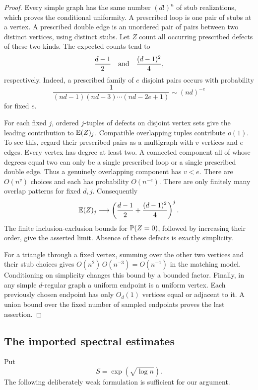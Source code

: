 \begin{proof}
Every simple graph has the same number \((d!)^n\) of stub realizations,
which proves the conditional uniformity.
A prescribed loop is one pair of stubs at a vertex. A prescribed
double edge is an unordered pair of pairs between two distinct vertices,
using distinct stubs. Let \(Z\) count all occurring prescribed defects
of these two kinds.
The expected counts tend to
\[
 \frac{d-1}{2}\quad\hbox{and}\quad\frac{(d-1)^2}{4},
\]
respectively.
Indeed, a prescribed family of \(e\) disjoint pairs occurs with
probability
\[
 \frac{1}{(nd-1)(nd-3)\cdots(nd-2e+1)}
       \sim(nd)^{-e}
\]
for fixed \(e\).

For each fixed \(j\), ordered \(j\)-tuples of defects on disjoint vertex
sets give the leading contribution to \(\mathbb E(Z)_j\).
Compatible overlapping tuples contribute \(o(1)\).
To see this, regard their prescribed pairs as a multigraph with \(v\)
vertices and \(e\) edges. Every vertex has degree at least two. A
connected component all of whose degrees equal two can only be a
single prescribed loop or a single prescribed double edge.
Thus a genuinely overlapping component has \(v<e\). There are
\(O(n^v)\) choices and each has probability \(O(n^{-e})\).
There are only finitely many overlap patterns for fixed \(d,j\).
Consequently
\[
 \mathbb E(Z)_j\longrightarrow
 \left(\frac{d-1}{2}+\frac{(d-1)^2}{4}\right)^j.
\]
The finite inclusion-exclusion bounds for \(\mathbb P(Z=0)\), followed by
increasing their order, give the asserted limit. Absence of these
defects is exactly simplicity.

For a triangle through a fixed vertex, summing over the other two
vertices and their stub choices gives
\(O(n^2)\,O(n^{-3})=O(n^{-1})\) in the matching model.
Conditioning on simplicity changes this bound by a bounded factor.
Finally, in any simple \(d\)-regular graph a uniform endpoint is a
uniform vertex. Each previously chosen endpoint has only \(O_d(1)\)
vertices equal or adjacent to it. A union bound over the fixed number
of sampled endpoints proves the last assertion.
\end{proof}

\subsection{The imported spectral estimates}

Put
\[
 S=\exp(\sqrt{\log n}).
\]
The following deliberately weak formulation is sufficient for our
argument.

